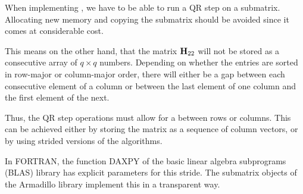 \begin{remark}
  When implementing , we have
  to be able to run a QR step on a submatrix. Allocating new memory
  and copying the submatrix should be avoided since it comes at
  considerable cost.

  This means on the other hand, that the matrix $\mathbf H_{22}$ will not
  be stored as a consecutive array of $q\times q$ numbers. Depending
  on whether the entries are sorted in row-major or column-major
  order, there will either be a gap between each consecutive element
  of a column or between the last element of one column and the first
  element of the next.

  Thus, the QR step operations must allow for a 
  between rows or columns. This can be achieved either by storing the
  matrix as a sequence of column vectors, or by using strided versions
  of the algorithms.

  In FORTRAN, the function DAXPY of the basic linear algebra
  subprograms (BLAS) library has explicit parameters for this
  stride. The submatrix objects of the Armadillo library implement
  this in a transparent way.
\end{remark}

